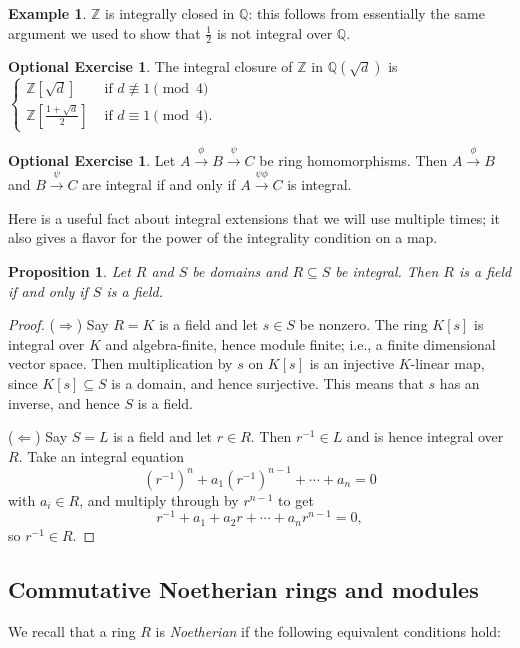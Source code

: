 \documentclass{amsart}[12pt]
\newcommand{\Q}{\mathbb{Q}}
\newcommand{\Z}{\mathbb{Z}}
\newcommand{\ZZ}{\mathbb{Z}}
\newcommand{\DEF}[1]{\emph{#1}\index{#1}}
\numberwithin{equation}{section}
\theoremstyle{plain} %
\newtheorem{prop}[equation]{Proposition}
\theoremstyle{definition}
\newtheorem{ex}[equation]{Example}
\newtheorem{exer}[equation]{Optional Exercise}
\theoremstyle{remark}
\newcommand{\ssec}[1]{\subsection{#1}}
\newcommand{\xra}[1]{\xrightarrow{#1}}
\begin{document}
\begin{ex}
$\Z$ is integrally closed in $\Q$: this follows from essentially the same argument we used to show that $\frac{1}{2}$ is not integral over $\Q$.
\end{ex}

\begin{exer}
The integral closure of $\ZZ$ in $\Q(\sqrt{d})$ is
$
\begin{cases}
\ZZ[\sqrt{d}] & \text{ if } d\not\equiv 1 \pmod 4\\
\ZZ[\frac{1+\sqrt{d}}{2}] & \text{ if } d\equiv 1 \pmod 4.
\end{cases}
$

\end{exer}

\begin{exer} Let $A \xra{\phi} B \xra{\psi} C$ be ring homomorphisms. Then $A \xra{\phi} B$ and $B \xra{\psi} C$ are integral if and only if $A \xra{\psi\phi} C$ is integral.
\end{exer}

Here is a useful fact about integral extensions that we will use multiple times; it also gives a flavor for the power of the integrality condition on a map.

\begin{prop} Let $R$ and $S$ be domains and $R\subseteq S$ be integral. Then $R$ is a field if and only if $S$ is a field.
\end{prop}
\begin{proof}
($\Rightarrow$) Say $R=K$ is a field and let $s\in S$ be nonzero. The ring $K[s]$ is integral over $K$ and algebra-finite, hence module finite; i.e., a finite dimensional vector space. Then multiplication by $s$ on $K[s]$ is  an injective $K$-linear map, since $K[s]\subseteq S$ is a domain, and hence surjective. This means that $s$ has an inverse, and hence $S$ is a field.

($\Leftarrow$) Say $S=L$ is a field and let $r\in R$. Then $r^{-1}\in L$ and is hence integral over $R$. Take an integral equation
\[ (r^{-1})^n + a_1 (r^{-1})^{n-1} + \cdots + a_n =0\]
with $a_i\in R$, and multiply through by $r^{n-1}$ to get
\[ r^{-1} + a_1 + a_2 r + \cdots + a_n r^{n-1} = 0,\]
so $r^{-1}\in R$.
\end{proof}

\ssec{Commutative Noetherian rings and modules}

We recall that a ring $R$ is \DEF{Noetherian} if the following equivalent conditions hold:
\end{document}
